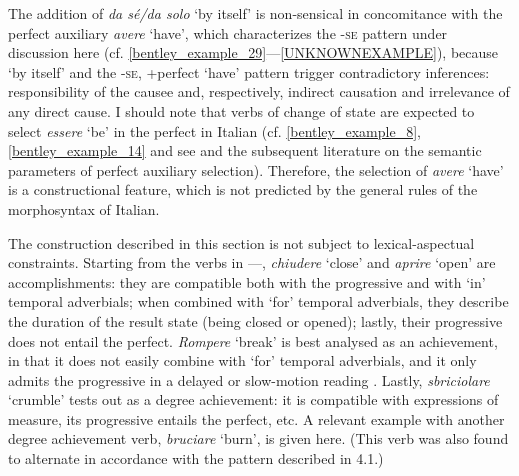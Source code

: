 \documentclass[output=paper,colorlinks,citecolor=brown
]{langscibook}
\begin{document}
The addition of\textit{ da sé/da solo} ‘by itself’ is non-sensical in concomitance with the perfect
auxiliary \textit{avere} ‘have’, which characterizes the -\textsc{se} pattern under discussion here
(cf. \ref{bentley_example_29}—\ref{UNKNOWNEXAMPLE}), because ‘by itself’ and the {-\textsc{se}, +perfect ‘have’} pattern trigger contradictory inferences: responsibility of the causee and, respectively, indirect causation and irrelevance of any direct cause. I should note that verbs of change of state are expected to select \textit{essere} ‘be’ in the perfect in Italian (cf. \ref{bentley_example_8}, \ref{bentley_example_14} and see \cite{perlmutter1989multiattachment} and the subsequent literature on the semantic parameters of perfect auxiliary selection). Therefore, the selection of \textit{avere }‘have’ is a constructional feature, which is not predicted by the general rules of the morphosyntax of Italian.

The construction described in this section is not subject to lexical-aspectual constraints. Starting from the verbs in —, \textit{chiudere} ‘close’ and \textit{aprire} ‘open’ are accomplishments: they are compatible both with the progressive and with ‘in’ temporal adverbials; when combined with ‘for’ temporal adverbials, they describe the duration of the result state (being closed or opened); lastly, their progressive does not entail the perfect. \textit{Rompere} ‘break’ is best analysed as an achievement, in that it does not easily combine with ‘for’ temporal adverbials, and it only admits the progressive in a delayed or slow-motion reading \citep{bertinetto2016tense,vivanco2021scalar}. Lastly, \textit{sbriciolare} ‘crumble’ tests out as a degree achievement: it is compatible with expressions of measure, its progressive entails the perfect, etc. A relevant example with another degree achievement verb, \textit{bruciare} ‘burn’, is given here. (This verb was also found to alternate in accordance with the pattern described in 4.1.)
\end{document}
